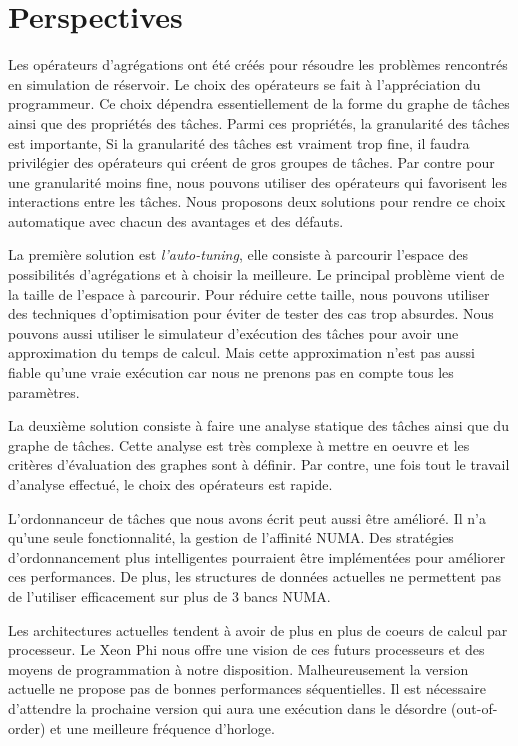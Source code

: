 \section{Perspectives}
Les opérateurs d'agrégations ont été créés pour résoudre les problèmes rencontrés en simulation de réservoir.
%
Le choix des opérateurs se fait à l'appréciation du programmeur.
%
Ce choix dépendra essentiellement de la forme du graphe de tâches ainsi que des propriétés des tâches.
%
Parmi ces propriétés, la granularité des tâches est importante,
%
Si la granularité des tâches est vraiment trop fine, il faudra privilégier des opérateurs qui créent de gros groupes de tâches.
%
Par contre pour une granularité moins fine, nous pouvons utiliser des opérateurs qui favorisent les interactions entre les tâches.
%
Nous proposons deux solutions pour rendre ce choix automatique avec chacun des avantages et des défauts.


La première solution est {\em l'auto-tuning}, elle consiste à parcourir l'espace des possibilités d'agrégations et à choisir la meilleure.
%
Le principal problème vient de la taille de l'espace à parcourir.
%
Pour réduire cette taille, nous pouvons utiliser des techniques d'optimisation pour éviter de tester des cas trop absurdes.
%
Nous pouvons aussi utiliser le simulateur d'exécution des tâches pour avoir une approximation du temps de calcul.
%
Mais cette approximation n'est pas aussi fiable qu'une vraie exécution car nous ne prenons pas en compte tous les paramètres.


La deuxième solution consiste à faire une analyse statique des tâches ainsi que du graphe de tâches.
%
Cette analyse est très complexe à mettre en oeuvre et les critères d'évaluation des graphes sont à définir.
%
Par contre, une fois tout le travail d'analyse effectué, le choix des opérateurs est rapide.


L'ordonnanceur de tâches que nous avons écrit peut aussi être amélioré.
%
Il n'a qu'une seule fonctionnalité, la gestion de l'affinité NUMA.
%
Des stratégies d'ordonnancement plus intelligentes pourraient être implémentées pour améliorer ces performances.
%
De plus, les structures de données actuelles ne permettent pas de l'utiliser efficacement sur plus de 3 bancs NUMA.



Les architectures actuelles tendent à avoir de plus en plus de coeurs de calcul par processeur.
%
Le Xeon Phi nous offre une vision de ces futurs processeurs et des moyens de programmation à notre disposition.
%
Malheureusement la version actuelle ne propose pas de bonnes performances séquentielles.
%
Il est nécessaire d'attendre la prochaine version qui aura une exécution dans le désordre (out-of-order) et une meilleure fréquence d'horloge.

